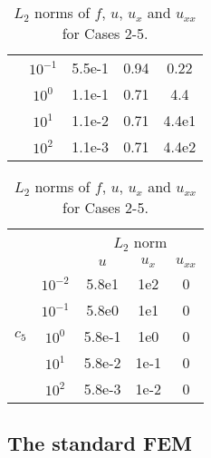 \documentclass[final,3p]{elsarticle}
\begin{document}
\begin{table}[!ht]
\begin{subtable}{0.5\textwidth}
\begin{tabular}{|c|c|c|c|c|}
\cline{2-5}
&$10^{-1}$ & {5.5e-1} & {0.94} & {0.22} \\
\cline{2-5} 
&$10^{0}$& 1.1e-1 & 0.71 & 4.4 \\
\cline{2-5} 
&$10^{1}$ & 1.1e-2 & 0.71 & 4.4e1 \\
\cline{2-5} 
&$10^{2}$& 1.1e-3 & 0.71 & 4.4e2 \\
\hline
\end{tabular}
\caption [sss] {Case 4.}
\label{Table: offsets Poisson pLov2pisin} 
\end{subtable}
\begin{subtable}{0.5\textwidth}
\centering
\begin{tabular}{|c|c|c|c|c|} \hline   
\multicolumn{2}{|c|}{} &\multicolumn{3}{c|}{$L_2$ norm} \\	%
\cline{3-5}
\multicolumn{2}{|c|}{}& $u$ & $u_{x}$ & $u_{xx}$ \\	%
\hline
\multirow{5}{*}{$c_5$}
&$10^{-2}$ & 5.8e1 & 1e2 & 0 \\
\cline{2-5} 
&$10^{-1}$& 5.8e0 & 1e1 & 0 \\
\cline{2-5}
&$10^{0}$& 5.8e-1 & 1e0 & 0 \\
\cline{2-5} 
&$10^{1}$& 5.8e-2 & 1e-1 & 0 \\
\cline{2-5} 
&$10^{2}$& 5.8e-3 & 1e-2 & 0 \\
\hline
\end{tabular}
\caption [sss] {Case 5.}
\label{Table: offsets Poisson pcoex}
\end{subtable}
\caption [sss] {$L_2$ norms of $f$, $u$, $u_{x}$ and $u_{xx}$ for Cases 2-5.}
\label{Table: offsets Poisson other cases}
\end{table}

\subsection{The standard FEM}

\pagebreak
\end{document}
